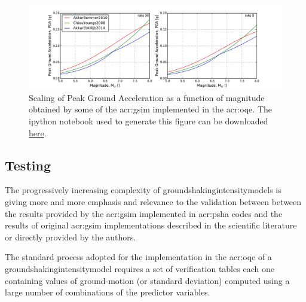 \begin{figure}[hb]
\centering
\includegraphics[trim = 23mm 0mm 23mm 5mm, clip, width=\textwidth]
    {./Pictures/gsim/mag_scaling_example.pdf}
\caption{Scaling of Peak Ground Acceleration as a function of magnitude 
    obtained by some of the \gls{acr:gsim} implemented in the \gls{acr:oqe}. 
    The ipython notebook used to generate this figure can be downloaded  
    \href{https://github.com/GEMScienceTools/hazard_book_2014/tree/lts/notebooks}{here}.}
\label{fig:gsim_mag_scaling}
\end{figure}
%
\subsection{Testing}
%
The progressively increasing complexity of 
\glspl{groundshakingintensitymodel}
is giving more and more emphasis and relevance to the validation between 
between the results provided by the \gls{acr:gsim} implemented in
\gls{acr:psha} codes and the results of original \gls{acr:gsim} 
implementations described in the scientific literature or directly 
provided by the authors.

The standard process adopted for the implementation in the 
\gls{acr:oqe} of a \gls{groundshakingintensitymodel} requires a 
set of verification tables each one containing values of 
ground-motion (or standard deviation) computed using a large 
number of combinations of the predictor variables. 

